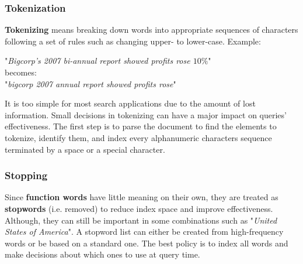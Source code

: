 \documentclass{article}
\begin{document}
\subsubsection{Tokenization}
\textbf{Tokenizing} means breaking down words into appropriate sequences of characters following a set of rules such as changing upper- to lower-case.
Example:
\begin{center}
    "\textit{Bigcorp's 2007 bi-annual report showed profits rose $10\%$}" \\ becomes: \\ "\textit{bigcorp 2007 annual report showed profits rose}"
\end{center}
It is too simple for most search applications due to the amount of lost information. Small decisions in tokenizing can have a major impact on queries' effectiveness.
The first step is to parse the document to find the elements to tokenize, identify them, and index every alphanumeric characters sequence terminated by a space or a special character.

\subsubsection{Stopping}
Since \textbf{function words} have little meaning on their own, they are treated as \textbf{stopwords} (i.e. removed) to reduce index space and improve effectiveness. Although, they can still be important in some combinations such as "\textit{United States of America}".
A stopword list can either be created from high-frequency words or be based on a standard one.
The best policy is to index all words and make decisions about which ones to use at query time.
\end{document}
